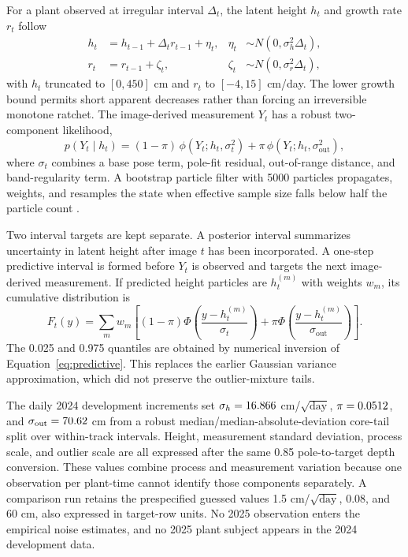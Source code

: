 \documentclass[12pt,letterpaper]{article}
\let\cite\parencite
\begin{document}
For a plant observed at irregular interval $\Delta_t$, the latent height $h_t$ and growth rate $r_t$ follow
\begin{align}
h_t &= h_{t-1}+\Delta_t r_{t-1}+\eta_t, & \eta_t&\sim N(0,\sigma_h^2\Delta_t), \\
r_t &= r_{t-1}+\zeta_t, & \zeta_t&\sim N(0,\sigma_r^2\Delta_t),
\label{eq:state}
\end{align}
with $h_t$ truncated to $[0,450]$ cm and $r_t$ to $[-4,15]$ cm/day. The lower growth bound permits short apparent decreases rather than forcing an irreversible monotone ratchet. The image-derived measurement $Y_t$ has a robust two-component likelihood,
\begin{equation}
p(Y_t\mid h_t)=(1-\pi)\,\phi(Y_t;h_t,\sigma_t^2)+\pi\,\phi(Y_t;h_t,\sigma_{\mathrm{out}}^2),
\label{eq:mixture}
\end{equation}
where $\sigma_t$ combines a base pose term, pole-fit residual, out-of-range distance, and band-regularity term. A bootstrap particle filter with 5000 particles propagates, weights, and resamples the state when effective sample size falls below half the particle count \cite{gordon1993particle}.

Two interval targets are kept separate. A posterior interval summarizes uncertainty in latent height after image $t$ has been incorporated. A one-step predictive interval is formed before $Y_t$ is observed and targets the next image-derived measurement. If predicted height particles are $h_t^{(m)}$ with weights $w_m$, its cumulative distribution is
\begin{equation}
F_t(y)=\sum_m w_m\left[(1-\pi)\Phi\!\left(\frac{y-h_t^{(m)}}{\sigma_t}\right)+\pi\Phi\!\left(\frac{y-h_t^{(m)}}{\sigma_{\mathrm{out}}}\right)\right].
\label{eq:predictive}
\end{equation}
The 0.025 and 0.975 quantiles are obtained by numerical inversion of Equation~\ref{eq:predictive}. This replaces the earlier Gaussian variance approximation, which did not preserve the outlier-mixture tails.

The daily 2024 development increments set $\sigma_h=16.866{}$ cm/$\sqrt{\mathrm{day}}$, $\pi=0.0512{}$, and $\sigma_{\mathrm{out}}=70.62{}$ cm from a robust median/median-absolute-deviation core-tail split over \CalibrationIntervals{} within-track intervals. Height, measurement standard deviation, process scale, and outlier scale are all expressed after the same 0.85 pole-to-target depth conversion. These values combine process and measurement variation because one observation per plant-time cannot identify those components separately. A comparison run retains the prespecified guessed values 1.5 cm/$\sqrt{\mathrm{day}}$, 0.08, and 60 cm, also expressed in target-row units. No 2025 observation enters the empirical noise estimates, and no 2025 plant subject appears in the 2024 development data.
\end{document}

